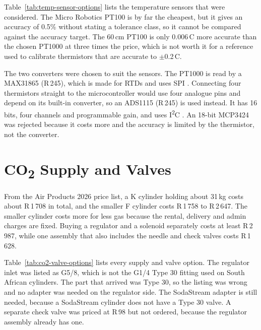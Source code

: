 Table~\ref{tab:temp-sensor-options} lists the temperature sensors that were considered. The Micro Robotics PT100 is by far the cheapest, but it gives an accuracy of 0.5\% without stating a tolerance class, so it cannot be compared against the accuracy target. The 60\,cm PT100 is only 0.006\,\textdegree{}C more accurate than the chosen PT1000 at three times the price, which is not worth it for a reference used to calibrate thermistors that are accurate to $\pm$0.2\,\textdegree{}C.

The two converters were chosen to suit the sensors. The PT1000 is read by a MAX31865 (R\,245), which is made for RTDs and uses SPI \citep{maxim_max31865_2015}. Connecting four thermistors straight to the microcontroller would use four analogue pins and depend on its built-in converter, so an ADS1115 (R\,245) is used instead. It has 16 bits, four channels and programmable gain, and uses I\textsuperscript{2}C \citep{ti_ads1115_2018}. An 18-bit MCP3424 was rejected because it costs more and the accuracy is limited by the thermistor, not the converter.

\section{CO\textsubscript{2} Supply and Valves}
\label{app:co2-valve-options}

From the Air Products 2026 price list, a K cylinder holding about 31\,kg costs about R\,1\,708 in total, and the smaller F cylinder costs R\,1\,758 to R\,2\,647. The smaller cylinder costs more for less gas because the rental, delivery and admin charges are fixed. Buying a regulator and a solenoid separately costs at least R\,2\,987, while one assembly that also includes the needle and check valves costs R\,1\,628.

Table~\ref{tab:co2-valve-options} lists every supply and valve option. The regulator inlet was listed as G5/8, which is not the G1/4 Type 30 fitting used on South African cylinders. The part that arrived was Type 30, so the listing was wrong and no adapter was needed on the regulator side. The SodaStream adapter is still needed, because a SodaStream cylinder does not have a Type 30 valve. A separate check valve was priced at R\,98 but not ordered, because the regulator assembly already has one.

